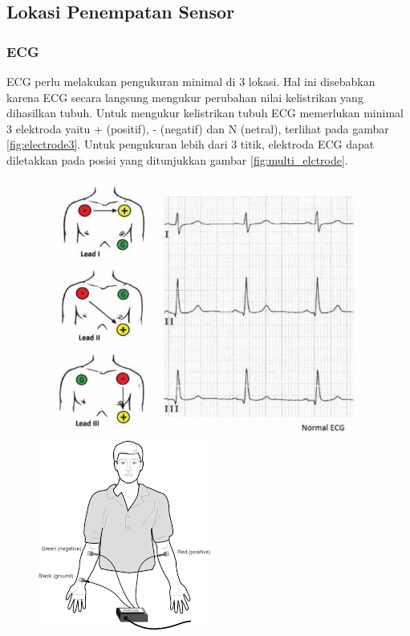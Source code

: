 \subsection{Lokasi Penempatan Sensor}
\subsubsection{ECG}
ECG perlu melakukan pengukuran minimal di 3 lokasi. Hal ini disebabkan karena ECG secara langsung mengukur perubahan nilai kelistrikan yang dihasilkan tubuh. Untuk mengukur kelistrikan tubuh ECG memerlukan minimal 3 elektroda yaitu + (positif), - (negatif) dan N (netral), terlihat pada gambar \ref{fig:electrode3}. Untuk pengukuran lebih dari 3 titik, elektroda ECG dapat diletakkan pada posisi yang ditunjukkan gambar \ref{fig:multi_elctrode}.

\begin{figure}[H]
    \centering
    \includegraphics[scale=0.3]{images/3_ecg_place.jpg}
	\includegraphics[scale=0.6]{images/3_ecg_place_2.png}    

\end{figure}
